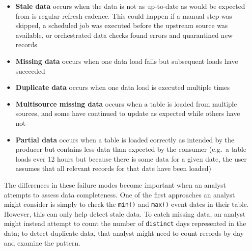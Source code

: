 \documentclass[
]{krantz}
\providecommand{\tightlist}{%
  \setlength{\itemsep}{0pt}\setlength{\parskip}{0pt}}
\begin{document}
\begin{itemize}
\tightlist
\item
  \textbf{Stale data} occurs when the data is not as up-to-date as would be expected from is regular refresh cadence. This could happen if a manual step was skipped, a scheduled job was executed before the upstream source was available, or orchestrated data checks found errors and quarantined new records
\item
  \textbf{Missing data} occurs when one data load fails but subsequent loads have succeeded
\item
  \textbf{Duplicate data} occurs when one data load is executed multiple times
\item
  \textbf{Multisource missing data} occurs when a table is loaded from multiple sources, and some have continued to update as expected while others have not
\item
  \textbf{Partial data} occurs when a table is loaded correctly as intended by the producer but contains less data than expected by the consumer (e.g.~a table loads ever 12 hours but because there is some data for a given date, the user assumes that all relevant records for that date have been loaded)
\end{itemize}

The differences in these failure modes become important when an analyst attempts to assess data completeness.
One of the first approaches an analyst might consider is simply to check the \texttt{min()} and \texttt{max()} event dates in their table.
However, this can only help detect stale data.
To catch missing data, an analyst might instead attempt to count the number of \texttt{distinct} days represented in the data; to detect duplicate data, that analyst might need to count records by day and examine the pattern.
\end{document}
